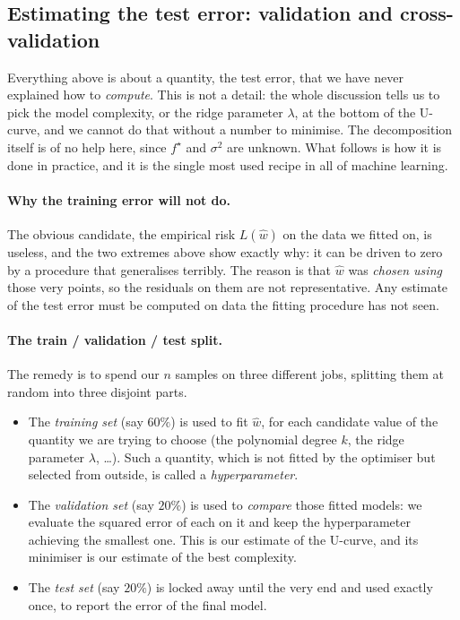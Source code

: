 \subsection{Estimating the test error: validation and cross-validation}
\label{subsec:cv}

Everything above is about a quantity, the test error, that we have never explained
how to \emph{compute}. This is not a detail: the whole discussion tells us to pick the
model complexity, or the ridge parameter $\lambda$, at the bottom of the U-curve, and
we cannot do that without a number to minimise. The decomposition itself is of no help
here, since $f^\star$ and $\sigma^2$ are unknown. What follows is how it is done in
practice, and it is the single most used recipe in all of machine learning.

\paragraph{Why the training error will not do.}
The obvious candidate, the empirical risk $L(\hat w)$ on the data we fitted on, is
useless, and the two extremes above show exactly why: it can be driven to zero by a
procedure that generalises terribly. The reason is that $\hat w$ was \emph{chosen
using} those very points, so the residuals on them are not representative. Any
estimate of the test error must be computed on data the fitting procedure has
not seen.

\paragraph{The train / validation / test split.}
The remedy is to spend our $n$ samples on three different jobs, splitting them at
random into three disjoint parts.
\begin{itemize}
    \item The \emph{training set} (say $60\%$) is used to fit $\hat w$, for each
    candidate value of the quantity we are trying to choose (the polynomial degree
    $k$, the ridge parameter $\lambda$, \dots). Such a quantity, which is not fitted by
    the optimiser but selected from outside, is called a \emph{hyperparameter}.
    \item The \emph{validation set} (say $20\%$) is used to \emph{compare} those
    fitted models: we evaluate the squared error of each on it and keep the
    hyperparameter achieving the smallest one. This is our estimate of the U-curve,
    and its minimiser is our estimate of the best complexity.
    \item The \emph{test set} (say $20\%$) is locked away until the very end and used
    exactly once, to report the error of the final model.
\end{itemize}

